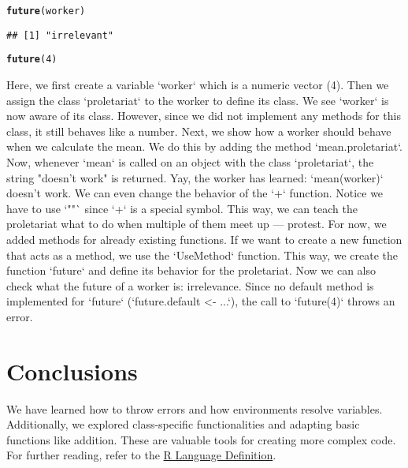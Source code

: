 \documentclass[twoside,twocolumn]{article}\usepackage[]{graphicx}\usepackage[dvipsnames]{xcolor}
\makeatletter
\newcommand{\hlnum}[1]{\textcolor[rgb]{0.686,0.059,0.569}{#1}}%
\newcommand{\hlstd}[1]{\textcolor[rgb]{0.345,0.345,0.345}{#1}}%
\newcommand{\hlkwd}[1]{\textcolor[rgb]{0.737,0.353,0.396}{\textbf{#1}}}%
\newenvironment{kframe}{%
 \def\at@end@of@kframe{}%
 \ifinner\ifhmode%
  \def\at@end@of@kframe{\end{minipage}}%
  \begin{minipage}{\columnwidth}%
 \fi\fi%
 \def\FrameCommand##1{\hskip\@totalleftmargin \hskip-\fboxsep
 \colorbox{shadecolor}{##1}\hskip-\fboxsep
     \hskip-\linewidth \hskip-\@totalleftmargin \hskip\columnwidth}%
 \MakeFramed {\advance\hsize-\width
   \@totalleftmargin\z@ \linewidth\hsize
   \@setminipage}}%
 {\par\unskip\endMakeFramed%
 \at@end@of@kframe}
\newenvironment{knitrout}{}{} %
\makeatother
\begin{document}
\begin{knitrout}
\color{fgcolor}\begin{kframe}
\begin{alltt}
\hlkwd{future}\hlstd{(worker)}
\end{alltt}
\begin{verbatim}
## [1] "irrelevant"
\end{verbatim}
\begin{alltt}
\hlkwd{future}\hlstd{(}\hlnum{4}\hlstd{)}
\end{alltt}


{\ttfamily\noindent\bfseries{}}\end{kframe}
\end{knitrout}

Here, we first create a variable `worker` which is a numeric vector (4). Then we assign the class `proletariat` to the worker to define its class. We see `worker` is now aware of its class. However, since we did not implement any methods for this class, it still behaves like a number. Next, we show how a worker should behave when we calculate the mean. We do this by adding the method `mean.proletariat`. Now, whenever `mean` is called on an object with the class `proletariat`, the string "doesn't work" is returned. Yay, the worker has learned: `mean(worker)` doesn't work. We can even change the behavior of the `+` function. Notice we have to use `""` since `+` is a special symbol. This way, we can teach the proletariat what to do when multiple of them meet up --- protest. For now, we added methods for already existing functions. If we want to create a new function that acts as a method, we use the `UseMethod` function. This way, we create the function `future` and define its behavior for the proletariat. Now we can also check what the future of a worker is: irrelevance. Since no default method is implemented for `future` (`future.default <- ...`), the call to `future(4)` throws an error.

\section*{Conclusions}
We have learned how to throw errors and how environments resolve variables. Additionally, we explored class-specific functionalities and adapting basic functions like addition. These are valuable tools for creating more complex code. For further reading, refer to the \href{https://cran.r-project.org/doc/manuals/r-release/R-lang.html#Definition}{R Language Definition}.
\end{document}
